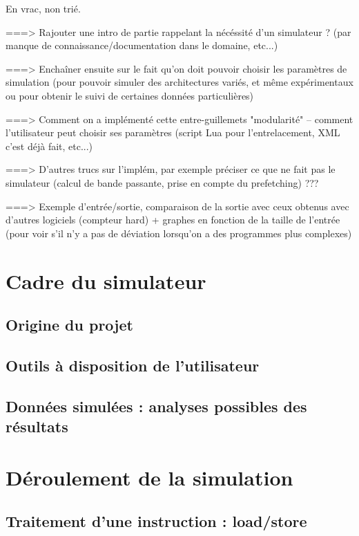 
En vrac, non trié.

===> Rajouter une intro de partie rappelant la nécéssité d'un simulateur ? (par manque de connaissance/documentation dans le domaine, etc...)

===> Enchaîner ensuite sur le fait qu'on doit pouvoir choisir les paramètres de simulation (pour pouvoir simuler des architectures variés, et même expérimentaux ou pour obtenir le suivi de certaines données particulières)

===> Comment on a implémenté cette entre-guillemets "modularité" -- comment l'utilisateur peut choisir ses paramètres (script Lua pour l'entrelacement, XML c'est déjà fait, etc...)

===> D'autres trucs sur l'implém, par exemple préciser ce que ne fait pas le simulateur (calcul de bande passante, prise en compte du prefetching) ???

===> Exemple d'entrée/sortie, comparaison de la sortie avec ceux obtenus avec d'autres logiciels (compteur hard) + graphes en fonction de la taille de l'entrée (pour voir s'il n'y a pas de déviation lorsqu'on a des programmes plus complexes)



\section{Cadre du simulateur}

\subsection{Origine du projet}

\subsection{Outils à disposition de l'utilisateur}

\subsection{Données simulées : analyses possibles des résultats}


\section{Déroulement de la simulation}

\subsection{Traitement d'une instruction : load/store}

